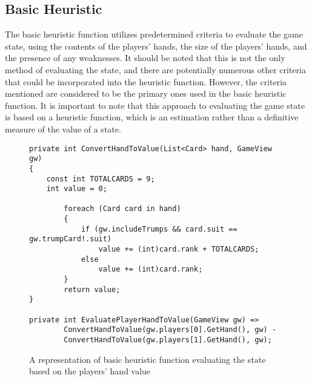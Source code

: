 \subsection{Basic Heuristic}
The basic heuristic function utilizes predetermined criteria to evaluate the game state, using the contents of the players' hands, the size of the players' hands, and the presence of any weaknesses. It should be noted that this is not the only method of evaluating the state, and there are potentially numerous other criteria that could be incorporated into the heuristic function. However, the criteria mentioned are considered to be the primary ones used in the basic heuristic function. It is important to note that this approach to evaluating the game state is based on a heuristic function, which is an estimation rather than a definitive measure of the value of a state.

\begin{figure}[h]
\captionsetup{justification=centering}
\begin{lstlisting}
private int ConvertHandToValue(List<Card> hand, GameView gw)
{
	const int TOTALCARDS = 9;
	int value = 0;

    	foreach (Card card in hand)
    	{
        	if (gw.includeTrumps && card.suit == gw.trumpCard!.suit)
            	value += (int)card.rank + TOTALCARDS;
        	else
            	value += (int)card.rank;
    	}
    	return value;
}

private int EvaluatePlayerHandToValue(GameView gw) =>
    	ConvertHandToValue(gw.players[0].GetHand(), gw) -
    	ConvertHandToValue(gw.players[1].GetHand(), gw);
\end{lstlisting}
\caption{A representation of basic heuristic function evaluating the state based on the players' hand value}
\label{fig:BHPlayersHandValue}
\end{figure}


